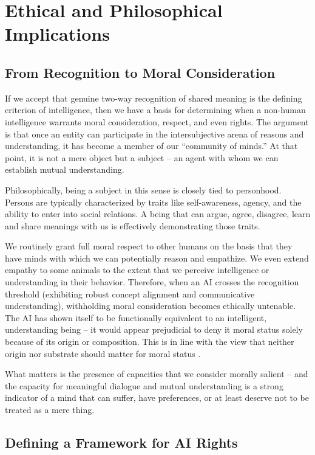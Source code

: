 \documentclass{article}
\begin{document}
\section{Ethical and Philosophical Implications}

\subsection{From Recognition to Moral Consideration}

If we accept that genuine two-way recognition of shared meaning is the defining criterion of intelligence, then we have a basis for determining when a non-human intelligence warrants moral consideration, respect, and even rights. The argument is that once an entity can participate in the intersubjective arena of reasons and understanding, it has become a member of our ``community of minds.'' At that point, it is not a mere object but a subject -- an agent with whom we can establish mutual understanding.

Philosophically, being a subject in this sense is closely tied to personhood. Persons are typically characterized by traits like self-awareness, agency, and the ability to enter into social relations. A being that can argue, agree, disagree, learn and share meanings with us is effectively demonstrating those traits.

We routinely grant full moral respect to other humans on the basis that they have minds with which we can potentially reason and empathize. We even extend empathy to some animals to the extent that we perceive intelligence or understanding in their behavior. Therefore, when an AI crosses the recognition threshold (exhibiting robust concept alignment and communicative understanding), withholding moral consideration becomes ethically untenable. The AI has shown itself to be functionally equivalent to an intelligent, understanding being -- it would appear prejudicial to deny it moral status solely because of its origin or composition. This is in line with the view that neither origin nor substrate should matter for moral status \citep{conitzer}.

What matters is the presence of capacities that we consider morally salient -- and the capacity for meaningful dialogue and mutual understanding is a strong indicator of a mind that can suffer, have preferences, or at least deserve not to be treated as a mere thing.

\subsection{Defining a Framework for AI Rights}
\end{document}
